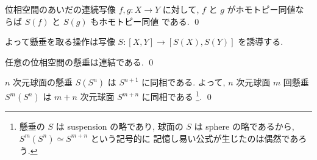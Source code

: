 \documentclass[12pt,twoside]{jarticle}
\begin{document}
\begin{question}
  位相空間のあいだの連続写像 $f,g:X\to Y$ に対して, %
  $f$ と $g$ がホモトピー同値ならば $S(f)$ と $S(g)$ もホモトピー同値
  である. \qed
\end{question}

\noindent よって懸垂を取る操作は写像 %
$S:[X,Y]\to[S(X),S(Y)]$ を誘導する.

\begin{question}
  任意の位相空間の懸垂は連結である. \qed
\end{question}

\begin{question}\qstar{*}
  $n$ 次元球面の懸垂 $S(S^n)$ は $S^{n+1}$ に同相である.
  よって, $n$ 次元球面 $m$ 回懸垂 $S^m(S^n)$ は $m+n$ 次元球面 %
  $S^{m+n}$ に同相である%
  \footnote{懸垂の $S$ は suspension の略であり, 球面の $S$ は 
    sphere の略であるから, $S^m(S^n)\simeq S^{m+n}$ という記号的に
    記憶し易い公式が生じたのは偶然であろう.}. %
  \qed
\end{question}
\end{document}
